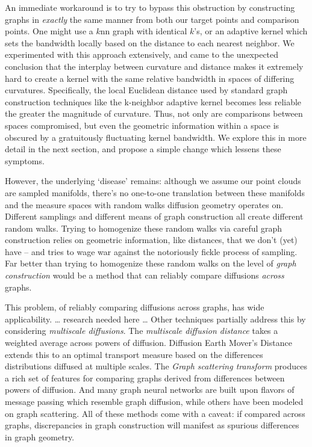 \documentclass[
  letterpaper,
  DIV=11,
  numbers=noendperiod]{scrartcl}
\theoremstyle{plain}
\theoremstyle{definition}
\theoremstyle{plain}
\theoremstyle{definition}
\theoremstyle{plain}
\theoremstyle{remark}
\begin{document}
An immediate workaround is to try to bypass this obstruction by
constructing graphs in \emph{exactly} the same manner from both our
target points and comparison points. One might use a \(k\)nn graph with
identical \(k\)'s, or an adaptive kernel which sets the bandwidth
locally based on the distance to each nearest neighbor. We experimented
with this approach extensively, and came to the unexpected conclusion
that the interplay between curvature and distance makes it extremely
hard to create a kernel with the same relative bandwidth in spaces of
differing curvatures. Specifically, the local Euclidean distance used by
standard graph construction techniques like the k-neighbor adaptive
kernel becomes less reliable the greater the magnitude of curvature.
Thus, not only are comparisons between spaces compromised, but even the
geometric information within a space is obscured by a gratuitously
fluctuating kernel bandwidth. We explore this in more detail in the next
section, and propose a simple change which lessens these symptoms.

However, the underlying `disease' remains: although we assume our point
clouds are sampled manifolds, there's no one-to-one translation between
these manifolds and the measure spaces with random walks diffusion
geometry operates on. Different samplings and different means of graph
construction all create different random walks. Trying to homogenize
these random walks via careful graph construction relies on geometric
information, like distances, that we don't (yet) have -- and tries to
wage war against the notoriously fickle process of sampling. Far better
than trying to homogenize these random walks on the level of \emph{graph
construction} would be a method that can reliably compare diffusions
\emph{across} graphs.

This problem, of reliably comparing diffusions across graphs, has wide
applicability. \ldots{} research needed here \ldots{} Other techniques
partially address this by considering \emph{multiscale diffusions}. The
\emph{multiscale diffusion distance} takes a weighted average across
powers of diffusion. Diffusion Earth Mover's Distance extends this to an
optimal transport measure based on the differences distributions
diffused at multiple scales. The \emph{Graph scattering transform}
produces a rich set of features for comparing graphs derived from
differences between powers of diffusion. And many graph neural networks
are built upon flavors of message passing which resemble graph
diffusion, while others have been modeled on graph scattering. All of
these methods come with a caveat: if compared across graphs,
discrepancies in graph construction will manifest as spurious
differences in graph geometry.
\end{document}
